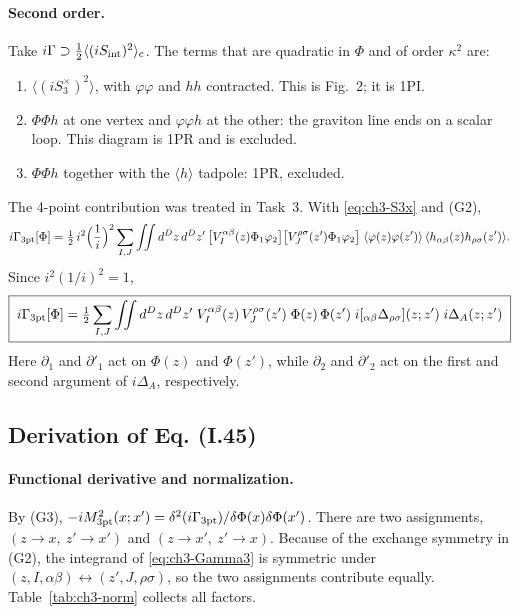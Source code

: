 \paragraph{Second order.}
Take $i\Gamma\supset\tfrac12\langle(iS_{\rm int})^2\rangle_{\rm c}$. The terms that are quadratic in $\Phi$ and of order $\kappa^2$ are:
\begin{enumerate}[leftmargin=18pt]
\item $\langle(iS_3^\times)^2\rangle$, with $\varphi\varphi$ and $hh$ contracted. This is Fig.~2; it is 1PI.
\item $\Phi\Phi h$ at one vertex and $\varphi\varphi h$ at the other: the graviton line ends on a scalar loop. This diagram is 1PR and is excluded.
\item $\Phi\Phi h$ together with the $\langle h\rangle$ tadpole: 1PR, excluded.
\end{enumerate}
The 4-point contribution was treated in Task~3. With \eqref{eq:ch3-S3x} and (G2),
\begin{equation*}
i\Gamma_{\rm 3pt}[\Phi]=\tfrac12\,i^2\Big(\frac1i\Big)^2\sum_{I,J}\iint d^Dz\,d^Dz'\,\big[V_I^{\alpha\beta}(z)\Phi_1\varphi_2\big]\big[V_J^{\rho\sigma}(z')\Phi_1\varphi_2\big]\;
\langle\varphi(z)\varphi(z')\rangle\,\langle h_{\alpha\beta}(z)h_{\rho\sigma}(z')\rangle .
\end{equation*}
Since $i^2(1/i)^2=1$,
\begin{equation}
\boxed{\;i\Gamma_{\rm 3pt}[\Phi]=\tfrac12\sum_{I,J}\iint d^Dz\,d^Dz'\;V_I^{\alpha\beta}(z)\,V_J^{\rho\sigma}(z')\;\Phi(z)\,\Phi(z')\;
i[{}_{\alpha\beta}\Delta_{\rho\sigma}](z;z')\;i\Delta_A(z;z')\;}
\label{eq:ch3-Gamma3}
\end{equation}
Here $\partial_1$ and $\partial'_1$ act on $\Phi(z)$ and $\Phi(z')$, while $\partial_2$ and $\partial'_2$ act on the first and second argument of $i\Delta_A$, respectively.

\subsection{Derivation of Eq. (I.45) \tD}

\paragraph{Functional derivative and normalization.}
By (G3), $-iM^2_{\rm 3pt}(x;x')=\delta^2(i\Gamma_{\rm 3pt})/\delta\Phi(x)\delta\Phi(x')$. There are two assignments,
$(z\to x,\ z'\to x')$ and $(z\to x',\ z'\to x)$. Because of the exchange symmetry in (G2), the integrand of \eqref{eq:ch3-Gamma3} is symmetric
under $(z,I,\alpha\beta)\leftrightarrow(z',J,\rho\sigma)$, so the two assignments contribute equally. Table~\ref{tab:ch3-norm} collects all factors.

